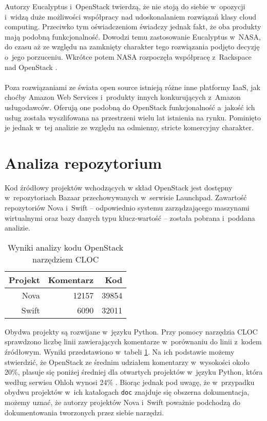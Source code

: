 	Autorzy Eucalyptus i~OpenStack twierdzą, że nie stoją do siebie w~opozycji
	i~widzą duże możliwości współpracy nad udoskonalaniem rozwiązań klasy cloud
	computing. Przeciwko tym oświadczeniom świadczy jednak fakt, że oba produkty
	mają podobną funkcjonalność. Dowodzi temu zastosowanie Eucalyptus w~NASA, do
	czasu aż ze względu na zamknięty charakter tego rozwiązania podjęto decyzję
	o~jego porzuceniu. Wkrótce potem NASA rozpoczęła współpracę z~Rackspace nad
	OpenStack \cite{openstack_vs_euca}.

	\paragraph{}

	Poza rozwiązaniami ze świata open source istnieją różne inne platformy IaaS,
	jak choćby Amazon Web Services i~produkty innych konkurujących z~Amazon
	usługodawców. Oferują one podobną do OpenStack funkcjonalność a~jakość ich
	usług została wyszlifowana na przestrzeni wielu lat istnienia na rynku.
	Pominięto je jednak w~tej analizie ze względu na odmienny, stricte
	komercyjny charakter.

	\section{Analiza repozytorium}

	Kod źródłowy projektów wchodzących w skład OpenStack jest dostępny
	w~repozytoriach Bazaar przechowywanych w~serwisie Launchpad. Zawartość
	repozytoriów Nova i~Swift -- odpowiednio systemu zarządzającego maszynami
	wirtualnymi oraz bazy danych typu klucz-wartość -- została pobrana i~poddana
	analizie.

	\begin{table}
		\centering
		\begin{tabular}{|r|r|r|}
			\hline
			\bf Projekt & \bf Komentarz & \phantom{asdf} \bf Kod \\
			\hline
			Nova & 12157 & 39854 \\
			Swift & 6090 & 32011 \\
			\hline
		\end{tabular}
		\caption{Wyniki analizy kodu OpenStack narzędziem CLOC}
		\label{tab:cloc}
	\end{table}

	Obydwa projekty są rozwijane w~języku Python. Przy pomocy narzędzia CLOC
	\cite{cloc} sprawdzono liczbę linii zawierających komentarze w~porównaniu do
	linii z~kodem źródłowym. Wyniki przedstawiono w~tabeli \ref{tab:cloc}.
	Na ich podstawie możemy stwierdzić, że OpenStack ze średnim udziałem
	komentarzy w~wysokości około 20\%, plasuje się poniżej średniej dla
	otwartych projektów w~języku Python, która według serwisu Ohloh wynosi 24\%
	\cite{ohloh_python_stats}. Biorąc jednak pod uwagę, że w~przypadku obydwu
	projektów w~ich katalogach \texttt{doc} znajduje się obszerna dokumentacja,
	możemy uznać, że autorzy projektów Nova i~Swift poważnie podchodzą do
	dokumentowania tworzonych przez siebie narzędzi.

